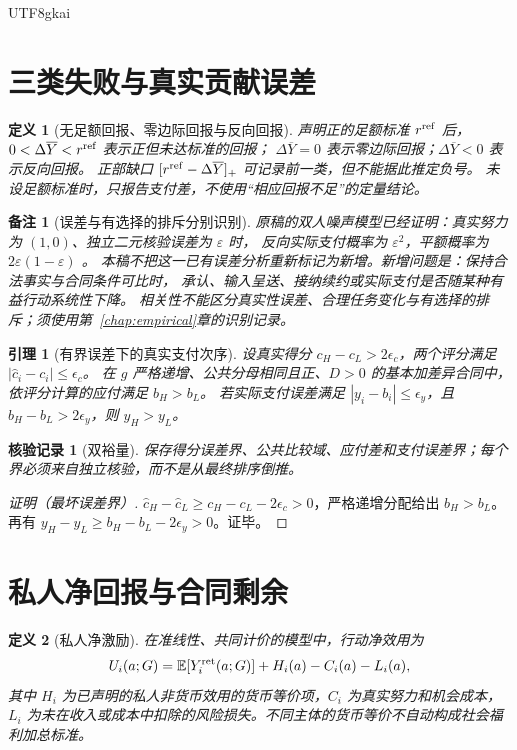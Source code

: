\documentclass[12pt,a4paper,openany]{report}
\newtheorem{definition}{定义}[chapter]
\newtheorem{lemma}{引理}[chapter]
\newtheorem{remark}{备注}[chapter]
\newtheorem{Certificate}{核验记录}[chapter]
\newcommand{\EE}{\mathbb E}
\newcommand{\Original}{原稿}
\begin{document}
\begin{CJK*}{UTF8}{gkai}
\section{三类失败与真实贡献误差}

\begin{definition}[无足额回报、零边际回报与反向回报]
声明正的足额标准 $r^{\rm ref}$ 后，$0<\Delta\overline Y<r^{\rm ref}$ 表示正但未达标准的回报；
$\Delta\overline Y=0$ 表示零边际回报；$\Delta\overline Y<0$ 表示反向回报。
正部缺口 $[r^{\rm ref}-\Delta\overline Y]_+$ 可记录前一类，但不能据此推定负号。
未设足额标准时，只报告支付差，不使用“相应回报不足”的定量结论。
\end{definition}

\begin{remark}[误差与有选择的排斥分别识别]
\Original 的双人噪声模型已经证明：真实努力为 $(1,0)$、独立二元核验误差为 $\varepsilon$ 时，
反向实际支付概率为 $\varepsilon^2$，平额概率为 $2\varepsilon(1-\varepsilon)$
\cite[章节“核验误差、组织合同与有限接纳规模”]{SourceMarket}。
本稿不把这一已有误差分析重新标记为新增。新增问题是：保持合法事实与合同条件可比时，
承认、输入呈送、接纳续约或实际支付是否随某种有益行动系统性下降。
相关性不能区分真实性误差、合理任务变化与有选择的排斥；须使用第~\ref{chap:empirical}章的识别记录。
\end{remark}

\begin{lemma}[有界误差下的真实支付次序]
\label{lem:order-error}
设真实得分 $c_H-c_L>2\epsilon_c$，两个评分满足
$|\widehat c_i-c_i|\le\epsilon_c$。
在 $g$ 严格递增、公共分母相同且正、$D>0$ 的基本加差异合同中，依评分计算的应付满足 $b_H>b_L$。
若实际支付误差满足 $|y_i-b_i|\le\epsilon_y$，且 $b_H-b_L>2\epsilon_y$，则 $y_H>y_L$。
\end{lemma}
\begin{Certificate}[双裕量]
保存得分误差界、公共比较域、应付差和支付误差界；每个界必须来自独立核验，而不是从最终排序倒推。
\end{Certificate}
\begin{proof}[证明（最坏误差界）]
$\widehat c_H-\widehat c_L\ge c_H-c_L-2\epsilon_c>0$，严格递增分配给出 $b_H>b_L$。
再有 $y_H-y_L\ge b_H-b_L-2\epsilon_y>0$。证毕。
\end{proof}

\section{私人净回报与合同剩余}

\begin{definition}[私人净激励]
在准线性、共同计价的模型中，行动净效用为
\[
 U_i(a;G)=\EE[Y_i^{\rm ret}(a;G)]+H_i(a)-C_i(a)-L_i(a),
\]
其中 $H_i$ 为已声明的私人非货币效用的货币等价项，$C_i$ 为真实努力和机会成本，
$L_i$ 为未在收入或成本中扣除的风险损失。不同主体的货币等价不自动构成社会福利加总标准。
\end{definition}


\end{CJK*}
\end{document}
